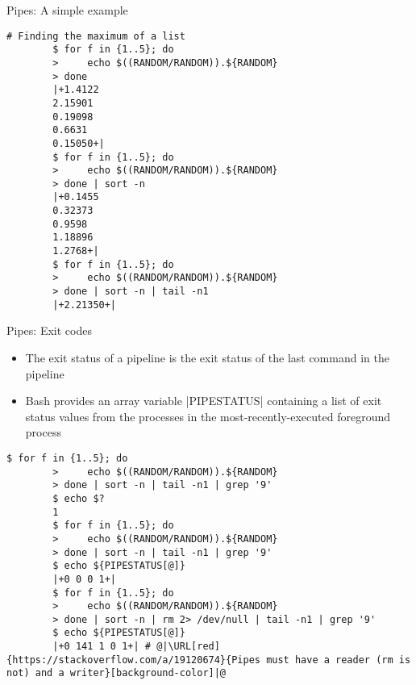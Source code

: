\begin{frame}[fragile]{Pipes: A simple example}
    \vspace{-2mm}
    \begin{lstlisting}[style=MyBash]
        # Finding the maximum of a list
        $ for f in {1..5}; do
        >     echo $((RANDOM/RANDOM)).${RANDOM}
        > done
        |+1.4122
        2.15901
        0.19098
        0.6631
        0.15050+|
        $ for f in {1..5}; do
        >     echo $((RANDOM/RANDOM)).${RANDOM}
        > done | sort -n
        |+0.1455
        0.32373
        0.9598
        1.18896
        1.2768+|
        $ for f in {1..5}; do
        >     echo $((RANDOM/RANDOM)).${RANDOM}
        > done | sort -n | tail -n1
        |+2.21350+|
    \end{lstlisting}
\end{frame}
\begin{frame}[fragile]{Pipes: Exit codes}
    \vspace{-3mm}
    \begin{itemize}
        \item The exit status of a pipeline is the exit status of the last command in the pipeline
        \item Bash provides an array variable \bash|PIPESTATUS| containing a list of exit status values from the processes in the most-recently-executed foreground process
    \end{itemize}
    \begin{lstlisting}[style=MyBash]
        $ for f in {1..5}; do
        >     echo $((RANDOM/RANDOM)).${RANDOM}
        > done | sort -n | tail -n1 | grep '9'
        $ echo $?
        1
        $ for f in {1..5}; do
        >     echo $((RANDOM/RANDOM)).${RANDOM}
        > done | sort -n | tail -n1 | grep '9'
        $ echo ${PIPESTATUS[@]}
        |+0 0 0 1+|
        $ for f in {1..5}; do
        >     echo $((RANDOM/RANDOM)).${RANDOM}
        > done | sort -n | rm 2> /dev/null | tail -n1 | grep '9'
        $ echo ${PIPESTATUS[@]}
        |+0 141 1 0 1+| # @|\URL[red]{https://stackoverflow.com/a/19120674}{Pipes must have a reader (rm is not) and a writer}[background-color]|@
    \end{lstlisting}
\end{frame}
